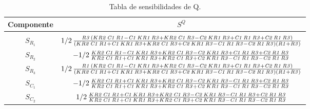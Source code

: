 \begin{table}[H]
\centering
\begin{tabular}{cc}
\hline
Componente & $S^{Q}$ \\ \hline\\
$S_{R_1}$  & $1/2\,{\frac {{\it R3}\, \left( K{\it R2}\,{\it C1}\,{\it R1}-{\it C1}
\,K{\it R1}\,{\it R3}+K{\it R2}\,{\it C1}\,{\it R3}-{\it C2}\,K{\it R1
}\,{\it R3}+{\it C1}\,{\it R1}\,{\it R3}+{\it C2}\,{\it R1}\,{\it R3}
 \right) }{ \left( K{\it R2}\,{\it C1}\,{\it R1}+{\it C1}\,K{\it R1}\,
{\it R3}+K{\it R2}\,{\it C1}\,{\it R3}+{\it C2}\,K{\it R1}\,{\it R3}-{
\it C1}\,{\it R1}\,{\it R3}-{\it C2}\,{\it R1}\,{\it R3} \right) 
 \left( {\it R1}+{\it R3} \right) }}$ \\
$S_{R_2}$  & $-1/2\,{\frac {K{\it R2}\,{\it C1}\,{\it R1}-{\it C1}\,K{\it R1}\,{\it 
R3}+K{\it R2}\,{\it C1}\,{\it R3}-{\it C2}\,K{\it R1}\,{\it R3}+{\it 
C1}\,{\it R1}\,{\it R3}+{\it C2}\,{\it R1}\,{\it R3}}{K{\it R2}\,{\it 
C1}\,{\it R1}+{\it C1}\,K{\it R1}\,{\it R3}+K{\it R2}\,{\it C1}\,{\it 
R3}+{\it C2}\,K{\it R1}\,{\it R3}-{\it C1}\,{\it R1}\,{\it R3}-{\it C2
}\,{\it R1}\,{\it R3}}}$ \\
$S_{R_3}$  & $1/2\,{\frac {{\it R1}\, \left( K{\it R2}\,{\it C1}\,{\it R1}-{\it C1}
\,K{\it R1}\,{\it R3}+K{\it R2}\,{\it C1}\,{\it R3}-{\it C2}\,K{\it R1
}\,{\it R3}+{\it C1}\,{\it R1}\,{\it R3}+{\it C2}\,{\it R1}\,{\it R3}
 \right) }{ \left( K{\it R2}\,{\it C1}\,{\it R1}+{\it C1}\,K{\it R1}\,
{\it R3}+K{\it R2}\,{\it C1}\,{\it R3}+{\it C2}\,K{\it R1}\,{\it R3}-{
\it C1}\,{\it R1}\,{\it R3}-{\it C2}\,{\it R1}\,{\it R3} \right) 
 \left( {\it R1}+{\it R3} \right) }}$ \\
$S_{C_1}$  & $-1/2\,{\frac {K{\it R2}\,{\it C1}\,{\it R1}+{\it C1}\,K{\it R1}\,{\it 
R3}+K{\it R2}\,{\it C1}\,{\it R3}-{\it C2}\,K{\it R1}\,{\it R3}-{\it 
C1}\,{\it R1}\,{\it R3}+{\it C2}\,{\it R1}\,{\it R3}}{K{\it R2}\,{\it 
C1}\,{\it R1}+{\it C1}\,K{\it R1}\,{\it R3}+K{\it R2}\,{\it C1}\,{\it 
R3}+{\it C2}\,K{\it R1}\,{\it R3}-{\it C1}\,{\it R1}\,{\it R3}-{\it C2
}\,{\it R1}\,{\it R3}}}$ \\
$S_{C_2}$  & $1/2\,{\frac {K{\it R2}\,{\it C1}\,{\it R1}+{\it C1}\,K{\it R1}\,{\it 
R3}+K{\it R2}\,{\it C1}\,{\it R3}-{\it C2}\,K{\it R1}\,{\it R3}-{\it 
C1}\,{\it R1}\,{\it R3}+{\it C2}\,{\it R1}\,{\it R3}}{K{\it R2}\,{\it 
C1}\,{\it R1}+{\it C1}\,K{\it R1}\,{\it R3}+K{\it R2}\,{\it C1}\,{\it 
R3}+{\it C2}\,K{\it R1}\,{\it R3}-{\it C1}\,{\it R1}\,{\it R3}-{\it C2
}\,{\it R1}\,{\it R3}}}$ \\
\hline
\end{tabular}
\caption{Tabla de sensibilidades de Q.}
\label{tab:sesq}
\end{table}

